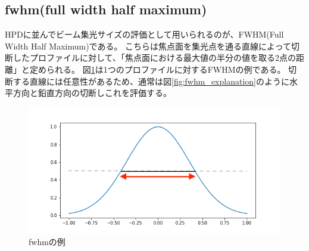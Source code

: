 \documentclass[dvipdfmx,autodetect-engine]{jreport}
\begin{document}
\subsection{fwhm(full width half maximum)}
HPDに並んでビーム集光サイズの評価として用いられるのが、FWHM(Full Width Half Maximum)である。
こちらは焦点面を集光点を通る直線によって切断したプロファイルに対して、「焦点面における最大値の半分の値を取る2点の距離」と定められる。
図\ref{fig:fwhm_explanation_profile}は1つのプロファイルに対するFWHMの例である。
切断する直線には任意性があるため、通常は図\ref{fig:fwhm_explanation}のように水平方向と鉛直方向の切断しこれを評価する。

\begin{figure}[h]
\centering
\includegraphics[scale=0.6]{images/error_simulation/explanation/fwhm.png}
\caption{fwhmの例}
\label{fig:fwhm_explanation_profile}
\end{figure}
\end{document}
